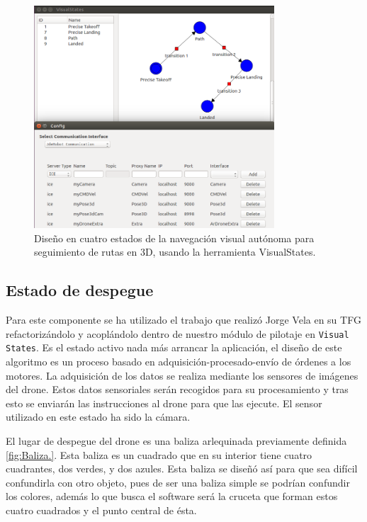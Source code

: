 \begin{figure}[H]
	\begin{center}
		\includegraphics[width=0.8\textwidth]{imag/IMG32.png}
				\caption{Diseño en cuatro estados de la navegación visual autónoma para seguimiento de rutas en 3D, usando la herramienta VisualStates.}
		\label{fig:Esquema VisualStates.}	
	\end{center}
\end{figure}

\subsection{Estado de despegue}
\hspace{1cm} Para este componente se ha utilizado el trabajo que realizó Jorge Vela en su TFG \cite{JorgeVela} refactorizándolo y acoplándolo dentro de nuestro módulo de pilotaje en \texttt{Visual States}. Es el estado activo nada más arrancar la aplicación, el diseño de este algoritmo es un proceso basado en adquisición-procesado-envío de órdenes a los motores. La adquisición de los datos se realiza mediante los sensores de imágenes del drone. Estos datos sensoriales serán recogidos para su procesamiento y tras esto se enviarán las instrucciones al drone para que las ejecute. El sensor utilizado en este estado ha sido la cámara.

\hspace{1cm} El lugar de despegue del drone es una baliza arlequinada previamente definida \ref{fig:Baliza.}. Esta baliza es un cuadrado que en su interior tiene cuatro cuadrantes, dos verdes, y dos azules. Esta baliza se diseñó así para que sea difícil confundirla con otro objeto, pues de ser una baliza simple se podrían confundir los colores, además lo que busca el software será la cruceta que forman estos cuatro cuadrados y el punto central de ésta.

